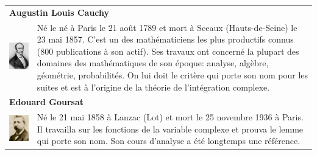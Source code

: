\begin{tabular}{ll}
\multicolumn{2}{l}{\textbf{Augustin Louis Cauchy}} \\[10pt]
\begin{minipage}{0.2\linewidth}
\includegraphics[scale=0.4]{images/Cauchy.jpg}
\end{minipage}
&
\begin{minipage}{0.65\linewidth}
Né le  né à Paris le 21 août 1789 et mort à Sceaux (Hauts-de-Seine) le 23 mai 1857. C'est un des mathématiciens les plus productifs connus (800 publications à son actif). Ses travaux ont concerné la plupart des domaines des mathématiques de son époque: analyse, algèbre, géométrie, probabilités. On lui doit le critère qui porte son nom pour les suites et est à l'origine de la théorie de l'intégration complexe. 
\end{minipage}\\
\multicolumn{2}{l}{\textbf{Edouard Goursat}} \\[10pt]
\begin{minipage}{0.2\linewidth}
\includegraphics[scale=0.4]{images/Goursat.jpg}
\end{minipage}
&
\begin{minipage}{0.65\linewidth}
 Né le 21 mai 1858 à Lanzac (Lot) et mort le 25 novembre 1936 à Paris. Il travailla sur les fonctions de la variable complexe et prouva le lemme qui porte son nom. Son cours d'analyse a été longtemps une référence.
\end{minipage}
\end{tabular}